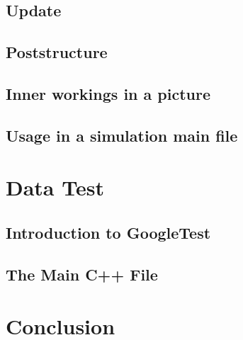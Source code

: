 \section{Update}

\section{Poststructure}

\section{Inner workings in a picture}

\section{Usage in a simulation main file}


\chapter{Data Test}

\section{Introduction to GoogleTest}

\section{The Main C++ File}


\chapter{Conclusion}

